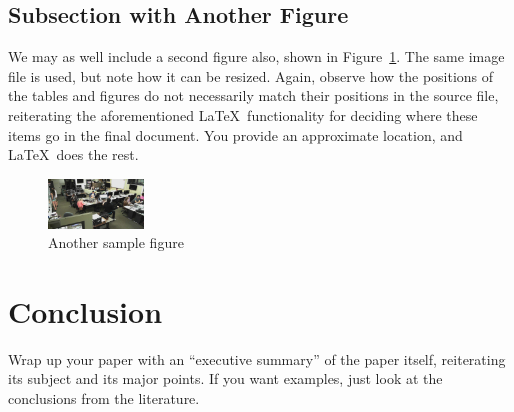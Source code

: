 \documentclass{article}
\begin{document}
\subsection{Subsection with Another Figure}

We may as well include a second figure also, shown in Figure~\ref{figure-sample2}.  The same image file is used, but note how it can be resized.  Again, observe how the positions of the tables and figures do not necessarily match their positions in the source file, reiterating the aforementioned \LaTeX\ functionality for deciding where these items go in the final document.  You provide an approximate location, and \LaTeX\ does the rest.

\begin{figure}
\centering
\includegraphics[width=1in]{space.jpg} 

\caption{Another sample figure}
\label{figure-sample2}
\end{figure}

\section{Conclusion}


Wrap up your paper with an ``executive summary'' of the paper itself, reiterating its subject and its major points.  If you want examples, just look at the conclusions from the literature.
\clearpage


{}

\end{document}
